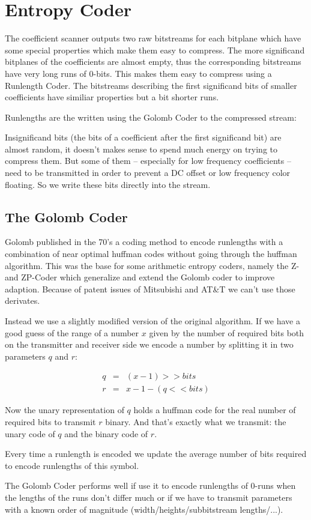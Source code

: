
\section{ Entropy Coder }
\label{entropy}

The coefficient scanner outputs two raw bitstreams for each bitplane which
have some special properties which make them easy to compress.
The more significand bitplanes of the coefficients are almost empty, thus
the corresponding bitstreams have very long runs of $0$-bits. This makes
them easy to compress using a Runlength Coder. The bitstreams describing
the first significand bits of smaller coefficients have similiar properties
but a bit shorter runs.

Runlengths are the written using the Golomb Coder to the compressed stream:

Insignificand bits (the bits of a coefficient after the first significand bit)
are almost random, it doesn't makes sense to spend much energy on trying
to compress them. But some of them -- especially for low frequency 
coefficients -- need to be transmitted in order to prevent a DC offset or low 
frequency color floating. So we write these bits directly into the stream.


\subsection{ The Golomb Coder }

Golomb published in the 70's a coding method to encode runlengths with a 
combination of near optimal huffman codes without going through the huffman
algorithm. This was the base for some arithmetic entropy coders, namely the 
Z- and ZP-Coder which generalize and extend the Golomb coder to improve adaption.
Because of patent issues of Mitsubishi and AT\&T we can't use those derivates.

Instead we use a slightly modified version of the original algorithm. If we 
have a good guess of the range of a number $x$ given by the number of required bits
both on the transmitter and receiver side we encode a number by splitting it in 
two parameters $q$ and $r$:

\begin{eqnarray}
q &=& (x - 1) >> bits     \nonumber\\
r &=& x - 1 - (q << bits) \nonumber
\end{eqnarray}

Now the unary representation of $q$ holds a huffman code for the real number of 
required bits to transmit $r$ binary. And that's exactly what we transmit: the 
unary code of $q$ and the binary code of $r$.

Every time a runlength is encoded we update the average number of bits required
to encode runlengths of this symbol.
 
The Golomb Coder performs well if use it to encode runlengths of 0-runs when the 
lengths of the runs don't differ much or if we have to transmit parameters with 
a known order of magnitude (width/heights/subbitstream lengths/...).



